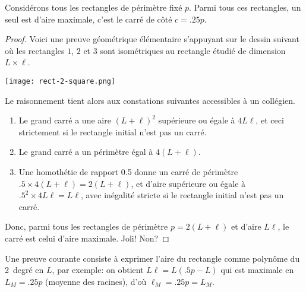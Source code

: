 \begin{fact} \label{iso-rect}
	Considérons tous les rectangles de périmètre fixé $p$. Parmi tous ces rectangles, un seul est d'aire maximale, c'est le carré de côté $c = \num{.25} p$.
\end{fact}


\begin{proof}
	Voici une preuve géométrique élémentaire s'appuyant sur le dessin suivant où les rectangles $1$, $2$ et $3$ sont isométriques au rectangle étudié de dimension $L \times \ell$.

	\begin{center}
		\texttt{[image: rect-2-square.png]}
	\end{center}
	
	Le raisonnement tient alors aux constations suivantes accessibles à un collégien.
	\begin{enumerate}
		\item Le grand carré a une aire $(L + \ell)^2$ supérieure ou égale à $4 L \ell$, et ceci strictement si le rectangle initial n'est pas un carré.

		\item Le grand carré a un périmètre égal à $4 (L + \ell)$.

		\item Une homothétie de rapport \num{.5} donne un carré 
		de périmètre $\num{.5} \times 4 (L + \ell) = 2 (L + \ell)$,
		et d'aire supérieure ou égale à $\num{.5}^2 \times 4 L \ell =  L \ell$, avec inégalité stricte si le rectangle initial n'est pas un carré.
	\end{enumerate}
	
	Donc, parmi tous les rectangles de périmètre $p = 2 (L + \ell)$ et d'aire $L \ell$, le carré est celui d'aire maximale. Joli! Non?
\end{proof}




\begin{remark}
	Une preuve courante consiste à exprimer l'aire du rectangle comme polynôme du 2\ieme\ degré en $L$, par exemple: on obtient $L \ell = L (\num{.5} p - L)$ qui est maximale en $L_M = \num{.25} p$ (moyenne des racines), d'où $\ell_M = \num{.25} p = L_M$.
\end{remark}




